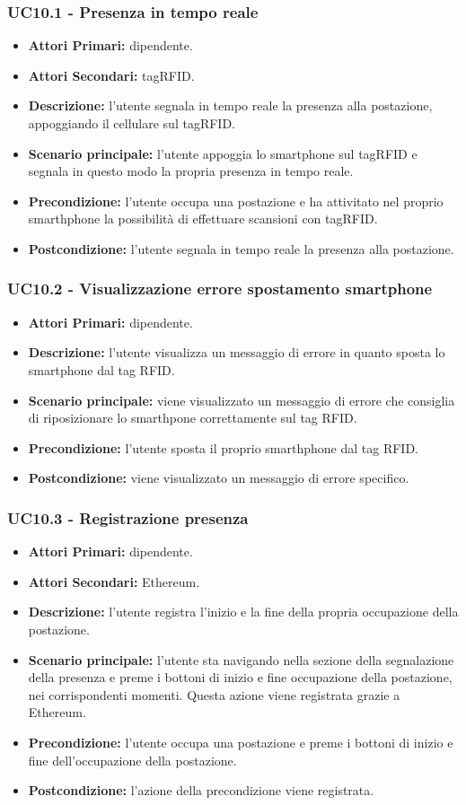 \subsubsection{ UC10.1 - Presenza in tempo reale}
\begin{itemize}
	\item\textbf{Attori Primari:} dipendente.
	\item\textbf{Attori Secondari:} tagRFID.
	\item\textbf{Descrizione:} l’utente segnala in tempo reale la presenza alla postazione, appoggiando il cellulare sul tagRFID.
	\item\textbf{Scenario principale:} l’utente appoggia lo smartphone sul tagRFID e segnala in questo modo la propria presenza in tempo reale.
	\item\textbf{Precondizione:} l’utente occupa una postazione e ha attivitato nel proprio smarthphone la possibilità di effettuare scansioni con tagRFID.
	\item\textbf{Postcondizione:} l’utente segnala in tempo reale la presenza alla postazione.
\end{itemize}
\subsubsection{ UC10.2 - Visualizzazione errore spostamento smartphone}
\begin{itemize}
	\item\textbf{Attori Primari:} dipendente.
	\item\textbf{Descrizione:} l’utente visualizza un messaggio di errore in quanto sposta lo smartphone dal tag RFID.
	\item\textbf{Scenario principale:} viene visualizzato un messaggio di errore che consiglia di riposizionare lo smarthpone correttamente sul tag RFID.
	\item\textbf{Precondizione:} l’utente sposta il proprio smarthphone dal tag RFID.
	\item\textbf{Postcondizione:} viene visualizzato un messaggio di errore specifico.
\end{itemize}
\subsubsection{ UC10.3 - Registrazione presenza}
\begin{itemize}
	\item\textbf{Attori Primari:} dipendente.
	\item\textbf{Attori Secondari:} Ethereum.
	\item\textbf{Descrizione:} l’utente registra l'inizio e la fine della propria occupazione della postazione.
	\item\textbf{Scenario principale:} l’utente sta navigando nella sezione della segnalazione della presenza e preme i bottoni di inizio e fine occupazione della postazione,
	nei corrispondenti momenti. Questa azione viene registrata grazie a Ethereum.
	\item\textbf{Precondizione:} l’utente occupa una postazione e preme i bottoni di inizio e fine dell'occupazione della postazione.
	\item\textbf{Postcondizione:} l'azione della precondizione viene registrata.
\end{itemize}
